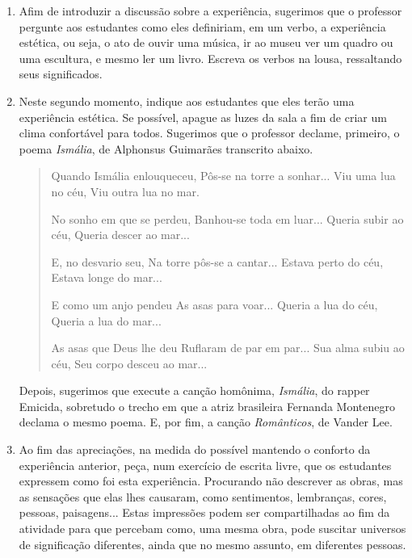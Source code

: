 \documentclass[12pt]{extarticle}
\begin{document}
\begin{enumerate}

  \item
  Afim de introduzir a discussão sobre a experiência, sugerimos
  que o professor pergunte aos estudantes como eles definiriam,
  em um verbo, a experiência estética, ou seja, o ato de ouvir uma 
  música, ir ao museu ver um quadro ou uma escultura, e mesmo ler um livro.
  Escreva os verbos na lousa, ressaltando seus significados.

  \item Neste segundo momento, indique aos estudantes que eles 
  terão uma experiência estética. Se possível, apague as luzes da
  sala a fim de criar um clima confortável para todos. Sugerimos
  que o professor declame, primeiro, o poema \textit{Ismália}, de 
  Alphonsus Guimarães transcrito abaixo.

\begin{verse}
\begin{itshape}
Quando Ismália enlouqueceu,
Pôs-se na torre a sonhar...
Viu uma lua no céu,
Viu outra lua no mar.

No sonho em que se perdeu,
Banhou-se toda em luar...
Queria subir ao céu,
Queria descer ao mar...

E, no desvario seu,
Na torre pôs-se a cantar...
Estava perto do céu,
Estava longe do mar...

E como um anjo pendeu
As asas para voar...
Queria a lua do céu,
Queria a lua do mar...

As asas que Deus lhe deu
Ruflaram de par em par...
Sua alma subiu ao céu,
Seu corpo desceu ao mar...
\end{itshape}
\end{verse}

  Depois, sugerimos que execute a canção homônima, \textit{Ismália}, do rapper Emicida,
  sobretudo o trecho em que a atriz brasileira Fernanda Montenegro declama
  o mesmo poema. E, por fim, a canção \textit{Românticos}, de Vander Lee.

  \item
  Ao fim das apreciações, na medida do possível mantendo o conforto
  da experiência anterior, peça, num exercício de escrita livre,
  que os estudantes expressem como foi esta experiência. Procurando
  não descrever as obras, mas as sensações que elas lhes causaram, 
  como sentimentos, lembranças, cores, pessoas, paisagens... 
  Estas impressões podem ser compartilhadas ao fim da atividade para 
  que percebam como, uma mesma obra, pode suscitar universos de
  significação diferentes, ainda que no mesmo assunto, em diferentes
  pessoas.

\end{enumerate}
\end{document}
